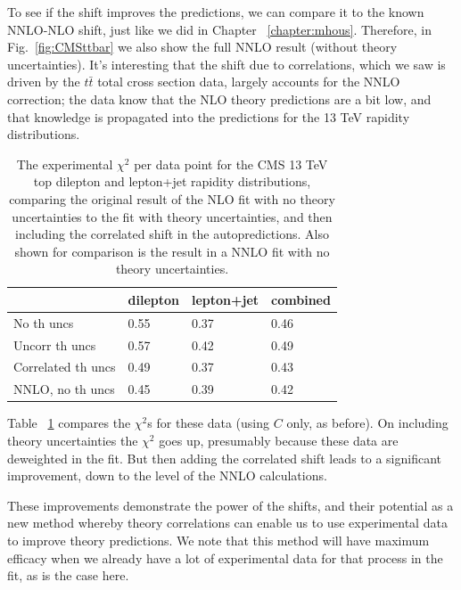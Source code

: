 To see if the shift improves the predictions, we can compare it to the known NNLO-NLO shift, just like we did in Chapter ~\ref{chapter:mhous}. Therefore, in Fig.~\ref{fig:CMSttbar} we also show the full NNLO result (without theory uncertainties). It's interesting that the shift due to correlations, which we saw is driven by the $t\bar{t}$ total cross section data, largely accounts for the NNLO correction; the data know that the NLO theory predictions are a bit low, and that knowledge is propagated into the predictions for the 13 TeV rapidity distributions. 
\begin{table}[h]
\centering
\begin{tabular}{|l||lll|}
\hline
                   & \textbf{dilepton} & \textbf{lepton+jet} & \textbf{combined} \\
                   \hline
No th uncs         &    0.55         &    0.37         & 0.46             \\
Uncorr th uncs     &   0.57         &    0.42         & 0.49               \\
Correlated th uncs &     0.49        &   0.37        & 0.43         \\
NNLO, no th uncs &    0.45        &    0.39     & 0.42          \\
\hline
\end{tabular}
\caption{The experimental $\chi^2$ per data point for the CMS 13 TeV top dilepton and lepton+jet rapidity distributions, comparing the original result of the NLO fit with no theory uncertainties to the fit with theory uncertainties, and then including the correlated shift in the autopredictions. Also shown for comparison is the result in a NNLO fit with no theory uncertainties.}
  \label{tab:topchisq}
\end{table}
Table ~\ref{tab:topchisq} compares the $\chi^2$s for these data (using $C$ only, as before). On including theory uncertainties the $\chi^2$ goes up, presumably because these data are deweighted in the fit. But then adding the correlated shift leads to a significant improvement, down to the level of the NNLO calculations. 

These improvements demonstrate the power of the shifts, and their potential as a new method whereby theory correlations can enable us to use experimental data to improve theory predictions. We note that this method will have maximum efficacy when we already have a lot of experimental data for that process in the fit, as is the case here.


